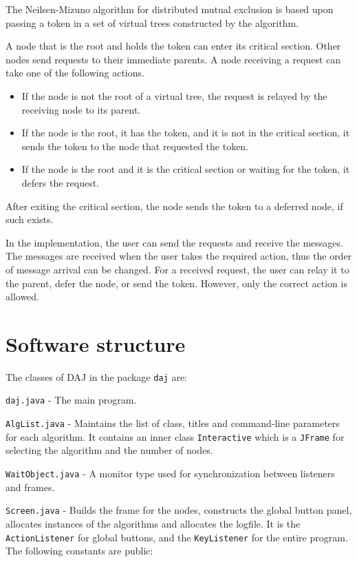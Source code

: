 \documentclass[11pt]{article}
\newcommand{\daj}{\textsc{DAJ}}
\newcommand{\p}[1]{\texttt{#1}}
\begin{document}
The Neilsen-Mizuno algorithm for distributed mutual exclusion is based
upon passing a token in a set of virtual trees constructed by the
algorithm.

A node that is the root and holds the token can enter its
critical section. Other nodes send requests to their immediate
parents. A node receiving a request can take one of the following actions.

\begin{itemize}
\item If the node is not the root of a virtual tree, the request is
relayed by the receiving node to its parent.
\item If the node is the root, it has the token, and it is not in the
critical section, it sends the token to the node that requested the
token.
\item If the node is the root and it is the critical section or
waiting for the token, it defers the request.
\end{itemize}

After exiting the critical section, the node sends the token to a
deferred node, if such exists.

In the implementation, the user can send the requests and receive the
messages. The messages are received when the user takes the required
action, thus the order of message arrival can be changed. For a
received request, the user can relay it to the parent, defer the node,
or send the token. However, only the correct action is allowed.

\section{Software structure}
The classes of \daj{} in the package \p{daj} are:

\p{daj.java} - The main program.

\p{AlgList.java} - Maintains the list of class, titles and
command-line parameters for each algorithm. It contains an inner
class \p{Interactive} which is a \p{JFrame} for selecting the
algorithm and the number of nodes.

\p{WaitObject.java} - A monitor type used for synchronization
between listeners and frames.

\p{Screen.java} - Builds the frame for the nodes, constructs the
global button panel, allocates instances of the algorithms and
allocates the logfile. It is the \p{ActionListener} for global
buttons, and the \p{KeyListener} for the entire program. The
following constants are public:
\end{document}
